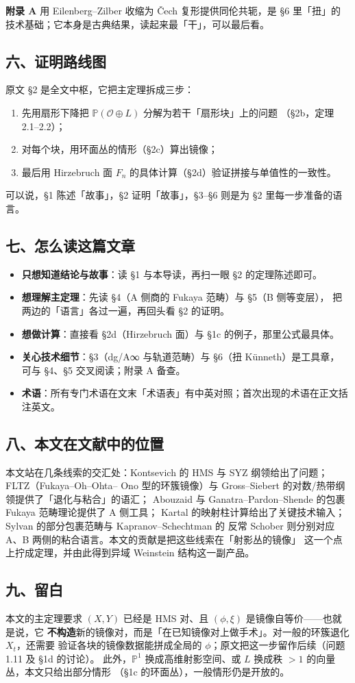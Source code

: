 \textbf{附录 A} 用 Eilenberg–Zilber 收缩为 Čech 复形提供同伦共轭，是 §6 里「扭」的
技术基础；它本身是古典结果，读起来最「干」，可以最后看。

\subsection*{六、证明路线图}

原文 §2 是全文中枢，它把主定理拆成三步：
\begin{enumerate}
\item 先用扇形下降把 $\mathbb{P}(\mathcal{O}\oplus L)$ 分解为若干「扇形块」上的问题
      （§2b，定理 2.1–2.2）；
\item 对每个块，用环面丛的情形（§2c）算出镜像；
\item 最后用 Hirzebruch 面 $F_n$ 的具体计算（§2d）验证拼接与单值性的一致性。
\end{enumerate}
可以说，§1 陈述「故事」，§2 证明「故事」，§3–§6 则是为 §2 里每一步准备的语言。

\subsection*{七、怎么读这篇文章}

\begin{itemize}
\item \textbf{只想知道结论与故事}：读 §1 与本导读，再扫一眼 §2 的定理陈述即可。
\item \textbf{想理解主定理}：先读 §4（A 侧商的 Fukaya 范畴）与 §5（B 侧等变层），
      把两边的「语言」各过一遍，再回头看 §2 的证明。
\item \textbf{想做计算}：直接看 §2d（Hirzebruch 面）与 §1c 的例子，那里公式最具体。
\item \textbf{关心技术细节}：§3（dg/A∞ 与轨道范畴）与 §6（扭 Künneth）是工具章，
      可与 §4、§5 交叉阅读；附录 A 备查。
\item \textbf{术语}：所有专门术语在文末「术语表」有中英对照；首次出现的术语在正文括注英文。
\end{itemize}

\subsection*{八、本文在文献中的位置}

本文站在几条线索的交汇处：Kontsevich 的 HMS 与 SYZ 纲领给出了问题；FLTZ（Fukaya–Oh–Ohta–
Ono 型的环簇镜像）与 Gross–Siebert 的对数/热带纲领提供了「退化与粘合」的语汇；
Abouzaid 与 Ganatra–Pardon–Shende 的包裹 Fukaya 范畴理论提供了 A 侧工具；
Kartal 的映射柱计算给出了关键技术输入；Sylvan 的部分包裹范畴与 Kapranov–Schechtman 的
反常 Schober 则分别对应 A、B 两侧的粘合语言。本文的贡献是把这些线索在「射影丛的镜像」
这一个点上拧成定理，并由此得到异域 Weinstein 结构这一副产品。

\subsection*{九、留白}

本文的主定理要求 $(X,Y)$ 已经是 HMS 对、且 $(\phi,\xi)$ 是镜像自等价——也就是说，它
\textbf{不构造}新的镜像对，而是「在已知镜像对上做手术」。对一般的环簇退化 $X_t$，还需要
验证各块的镜像数据能拼成全局的 $\phi$；原文把这一步留作后续（问题 1.11 及 §1d 的讨论）。
此外，$\mathbb{P}^1$ 换成高维射影空间、或 $L$ 换成秩 $>1$ 的向量丛，本文只给出部分情形
（§1c 的环面丛），一般情形仍是开放的。
